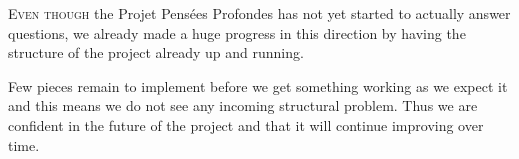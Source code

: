 \lettrine{E}{ven though} the Projet Pensées Profondes has not yet started to actually
answer questions, we already made a huge progress in this direction
by having the structure of the project already up and running.

Few pieces remain to implement before we get something working as we
expect it and this means we do not see any incoming structural problem.
Thus we are confident in the future of the project and that it will
continue improving over time.
